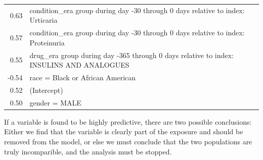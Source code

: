 \documentclass[11pt]{book}
\let\BeginKnitrBlock\begin \let\EndKnitrBlock\end
\begin{document}
\begin{longtable}[]{@{}rl@{}}
\begin{minipage}[t]{0.07\columnwidth}\raggedleft\strut
0.63\strut
\end{minipage} & \begin{minipage}[t]{0.87\columnwidth}\raggedright\strut
condition\_era group during day -30 through 0 days relative to index:
Urticaria\strut
\end{minipage}\tabularnewline
\begin{minipage}[t]{0.07\columnwidth}\raggedleft\strut
0.57\strut
\end{minipage} & \begin{minipage}[t]{0.87\columnwidth}\raggedright\strut
condition\_era group during day -30 through 0 days relative to index:
Proteinuria\strut
\end{minipage}\tabularnewline
\begin{minipage}[t]{0.07\columnwidth}\raggedleft\strut
0.55\strut
\end{minipage} & \begin{minipage}[t]{0.87\columnwidth}\raggedright\strut
drug\_era group during day -365 through 0 days relative to index:
INSULINS AND ANALOGUES\strut
\end{minipage}\tabularnewline
\begin{minipage}[t]{0.07\columnwidth}\raggedleft\strut
-0.54\strut
\end{minipage} & \begin{minipage}[t]{0.87\columnwidth}\raggedright\strut
race = Black or African American\strut
\end{minipage}\tabularnewline
\begin{minipage}[t]{0.07\columnwidth}\raggedleft\strut
0.52\strut
\end{minipage} & \begin{minipage}[t]{0.87\columnwidth}\raggedright\strut
(Intercept)\strut
\end{minipage}\tabularnewline
\begin{minipage}[t]{0.07\columnwidth}\raggedleft\strut
0.50\strut
\end{minipage} & \begin{minipage}[t]{0.87\columnwidth}\raggedright\strut
gender = MALE\strut
\end{minipage}\tabularnewline
\bottomrule
\end{longtable}

\BeginKnitrBlock{rmdimportant}
If a variable is found to be highly predictive, there are two possible
conclusions: Either we find that the variable is clearly part of the
exposure and should be removed from the model, or else we must conclude
that the two populations are truly incomparible, and the analysis must
be stopped.
\EndKnitrBlock{rmdimportant}
\end{document}
